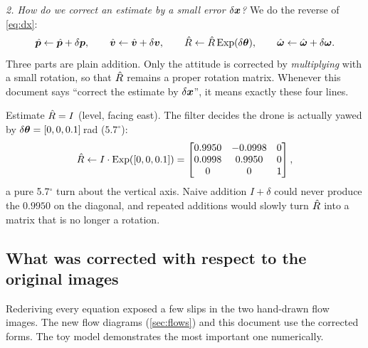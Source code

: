 \emph{2. How do we correct an estimate by a small error $\delta\bm{x}$?} We do the reverse of \eqref{eq:dx}:
\begin{equation}
\label{eq:correct}
  \hat{\bm p}\leftarrow\hat{\bm p}+\delta\bm{p},\qquad \hat{\bm v}\leftarrow\hat{\bm v}+\delta\bm{v},\qquad
  \hat{R}\leftarrow\hat{R}\,\mathrm{Exp}(\delta\bm{\theta}),\qquad \hat{\bm\omega}\leftarrow\hat{\bm\omega}+\delta\bm{\omega} .
\end{equation}
Three parts are plain addition. Only the attitude is corrected by \emph{multiplying} with a small rotation, so that
$\hat{R}$ remains a proper rotation matrix. Whenever this document says ``correct the estimate by $\delta\bm{x}$'', it means
exactly these four lines.

\begin{toybox}
Estimate $\hat{R}=I$ (level, facing east). The filter decides the drone is actually yawed by $\delta\bm{\theta}=[0,0,0.1]$\,rad
($5.7^\circ$):
\[
\hat{R}\leftarrow I\cdot\mathrm{Exp}([0,0,0.1])=\begin{bmatrix}0.9950&-0.0998&0\\0.0998&0.9950&0\\0&0&1\end{bmatrix},
\]
a pure 5.7$^\circ$ turn about the vertical axis. Naive addition $I+\delta$ could never produce the $0.9950$ on the
diagonal, and repeated additions would slowly turn $\hat{R}$ into a matrix that is no longer a rotation.
\end{toybox}

\subsection{What was corrected with respect to the original images}
\label{sec:errata}

Rederiving every equation exposed a few slips in the two hand-drawn flow images. The new flow diagrams
(\cref{sec:flows}) and this document use the corrected forms. The toy model demonstrates the most important
one numerically.

